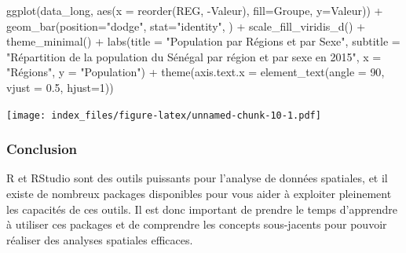 \documentclass[
]{article}
\newenvironment{Shaded}{\begin{snugshade}}{\end{snugshade}}
\newcommand{\AttributeTok}[1]{\textcolor[rgb]{0.77,0.63,0.00}{#1}}
\newcommand{\DecValTok}[1]{\textcolor[rgb]{0.00,0.00,0.81}{#1}}
\newcommand{\FloatTok}[1]{\textcolor[rgb]{0.00,0.00,0.81}{#1}}
\newcommand{\FunctionTok}[1]{\textcolor[rgb]{0.00,0.00,0.00}{#1}}
\newcommand{\NormalTok}[1]{#1}
\newcommand{\SpecialCharTok}[1]{\textcolor[rgb]{0.00,0.00,0.00}{#1}}
\newcommand{\StringTok}[1]{\textcolor[rgb]{0.31,0.60,0.02}{#1}}
\begin{document}
\begin{Shaded}
\begin{Highlighting}[]
\FunctionTok{ggplot}\NormalTok{(data\_long, }\FunctionTok{aes}\NormalTok{(}\AttributeTok{x =} \FunctionTok{reorder}\NormalTok{(REG, }\SpecialCharTok{{-}}\NormalTok{Valeur), }\AttributeTok{fill=}\NormalTok{Groupe, }\AttributeTok{y=}\NormalTok{Valeur)) }\SpecialCharTok{+} 
  \FunctionTok{geom\_bar}\NormalTok{(}\AttributeTok{position=}\StringTok{"dodge"}\NormalTok{, }\AttributeTok{stat=}\StringTok{"identity"}\NormalTok{, ) }\SpecialCharTok{+}
  \FunctionTok{scale\_fill\_viridis\_d}\NormalTok{() }\SpecialCharTok{+}
  \FunctionTok{theme\_minimal}\NormalTok{() }\SpecialCharTok{+}
  \FunctionTok{labs}\NormalTok{(}\AttributeTok{title =} \StringTok{"Population par Régions et par Sexe"}\NormalTok{,}
       \AttributeTok{subtitle =} \StringTok{"Répartition de la population du Sénégal par région et par sexe en 2015"}\NormalTok{,}
       \AttributeTok{x =} \StringTok{"Régions"}\NormalTok{,}
       \AttributeTok{y =} \StringTok{"Population"}\NormalTok{) }\SpecialCharTok{+}
  \FunctionTok{theme}\NormalTok{(}\AttributeTok{axis.text.x =} \FunctionTok{element\_text}\NormalTok{(}\AttributeTok{angle =} \DecValTok{90}\NormalTok{, }\AttributeTok{vjust =} \FloatTok{0.5}\NormalTok{, }\AttributeTok{hjust=}\DecValTok{1}\NormalTok{))}
\end{Highlighting}
\end{Shaded}

\texttt{[image: index\_files/figure-latex/unnamed-chunk-10-1.pdf]}

\hypertarget{conclusion}{%
\subsubsection{Conclusion}\label{conclusion}}

R et RStudio sont des outils puissants pour l'analyse de données
spatiales, et il existe de nombreux packages disponibles pour vous aider
à exploiter pleinement les capacités de ces outils. Il est donc
important de prendre le temps d'apprendre à utiliser ces packages et de
comprendre les concepts sous-jacents pour pouvoir réaliser des analyses
spatiales efficaces.
\end{document}
